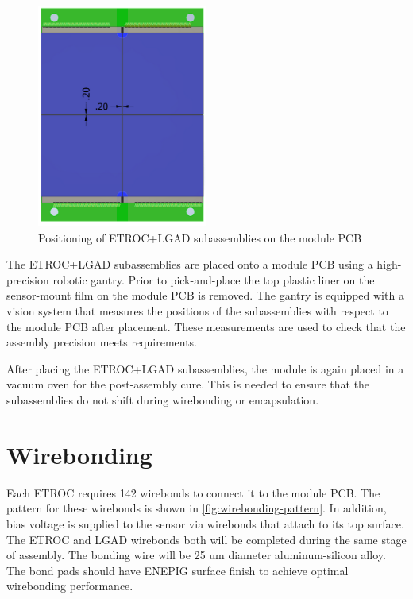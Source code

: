 \documentclass[10pt]{datasheet}
\begin{document}
\begin{figure}[h]
	\centering
	\includegraphics[width=0.5\textwidth,angle=90]{figures/module-with-bbms.png}
	\caption{Positioning of ETROC+LGAD subassemblies on the module PCB}
	\label{fig:mod-with-bbms}	
\end{figure}

The ETROC+LGAD subassemblies are placed onto a module PCB using a high-precision robotic gantry. Prior to pick-and-place the top plastic liner on the sensor-mount film on the module PCB is removed. The gantry is equipped with a vision system that measures the positions of the subassemblies with respect to the module PCB after placement. These measurements are used to check that the assembly precision meets requirements.

After placing the ETROC+LGAD subassemblies, the module is again placed in a vacuum oven for the post-assembly cure. This is needed to ensure that the subassemblies do not shift during wirebonding or encapsulation.


\section{Wirebonding}

Each ETROC requires 142 wirebonds to connect it to the module PCB. The pattern for these wirebonds is shown in \ref{fig:wirebonding-pattern}. In addition, bias voltage is supplied to the sensor via wirebonds that attach to its top surface. The ETROC and LGAD wirebonds both will be completed during the same stage of assembly. The bonding wire will be 25 um diameter aluminum-silicon alloy. The bond pads should have ENEPIG surface finish to achieve optimal wirebonding performance.
\end{document}
